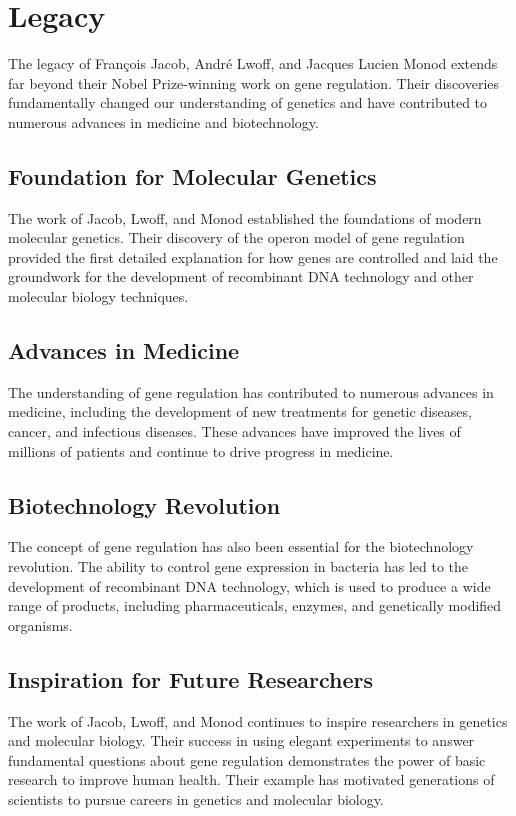 \section{Legacy}

The legacy of Fran\c{c}ois Jacob, Andr\'e Lwoff, and Jacques Lucien Monod extends far beyond their Nobel Prize-winning work on gene regulation. Their discoveries fundamentally changed our understanding of genetics and have contributed to numerous advances in medicine and biotechnology.

\subsection{Foundation for Molecular Genetics}

The work of Jacob, Lwoff, and Monod established the foundations of modern molecular genetics. Their discovery of the operon model of gene regulation provided the first detailed explanation for how genes are controlled and laid the groundwork for the development of recombinant DNA technology and other molecular biology techniques.

\subsection{Advances in Medicine}

The understanding of gene regulation has contributed to numerous advances in medicine, including the development of new treatments for genetic diseases, cancer, and infectious diseases. These advances have improved the lives of millions of patients and continue to drive progress in medicine.

\subsection{Biotechnology Revolution}

The concept of gene regulation has also been essential for the biotechnology revolution. The ability to control gene expression in bacteria has led to the development of recombinant DNA technology, which is used to produce a wide range of products, including pharmaceuticals, enzymes, and genetically modified organisms.

\subsection{Inspiration for Future Researchers}

The work of Jacob, Lwoff, and Monod continues to inspire researchers in genetics and molecular biology. Their success in using elegant experiments to answer fundamental questions about gene regulation demonstrates the power of basic research to improve human health. Their example has motivated generations of scientists to pursue careers in genetics and molecular biology.

